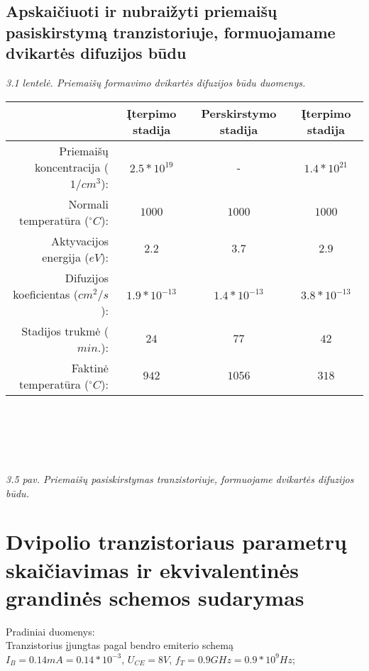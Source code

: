 \documentclass[11pt,a4paper]{article}
\begin{document}
\subsection{Apskaičiuoti ir nubraižyti priemaišų pasiskirstymą tranzistoriuje, formuojamame dvikartės difuzijos būdu}

\textsl{3.1 lentelė. Priemaišų formavimo dvikartės difuzijos būdu duomenys.}\\
\begin{tabular}{|r|c|c|c|}\hline
  & Įterpimo stadija & Perskirstymo stadija & Įterpimo stadija \\ \hline
  Priemaišų koncentracija ($1/cm^3$): & $2.5*10^{19}$   & -              & $1.4*10^{21}$ \\ \hline
  Normali temperatūra ($^{\circ}C$):   & $1000$         & $1000$         & $1000$ \\ \hline
  Aktyvacijos energija ($eV$):        & $2.2$          & $3.7$          & $2.9$ \\ \hline
  Difuzijos koeficientas ($cm^2/s$):  & $1.9*10^{-13}$  & $1.4*10^{-13}$  & $3.8*10^{-13}$ \\  \hline
  Stadijos trukmė ($min.$):           & $24$           & $77$           & $42$ \\ \hline
  Faktinė temperatūra ($^{\circ}C$):   & $942$          & $1056$         & $318$ \\ \hline
\end{tabular}\\\\\\
\\
\textsl{3.5 pav. Priemaišų pasiskirstymas tranzistoriuje, formuojame dvikartės difuzijos būdu.}

\section{Dvipolio tranzistoriaus parametrų skaičiavimas ir ekvivalentinės grandinės schemos sudarymas}
Pradiniai duomenys:\\
Tranzistorius įjungtas pagal bendro emiterio schemą\\
$I_B = 0.14 mA = 0.14 * 10^{-3}$, $U_{CE} = 8V$, $f_{T} = 0.9 GHz = 0.9*10^{9}Hz$;\\
\end{document}
